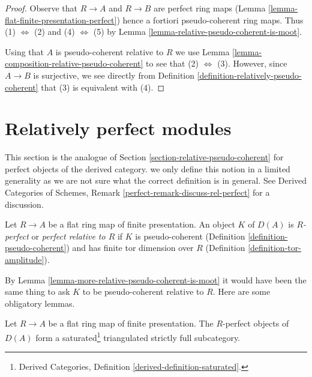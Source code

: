 \begin{proof}
Observe that $R \to A$ and $R \to B$ are perfect ring maps
(Lemma \ref{lemma-flat-finite-presentation-perfect})
hence a fortiori pseudo-coherent ring maps.
Thus (1) $\Leftrightarrow$ (2) and (4) $\Leftrightarrow$ (5)
by Lemma \ref{lemma-relative-pseudo-coherent-is-moot}.

\medskip\noindent
Using that $A$ is pseudo-coherent relative to $R$ we use
Lemma \ref{lemma-composition-relative-pseudo-coherent}
to see that (2) $\Leftrightarrow$ (3).
However, since $A \to B$ is surjective, we see directly from
Definition \ref{definition-relatively-pseudo-coherent}
that (3) is equivalent with (4).
\end{proof}



\section{Relatively perfect modules}
\label{section-relatively-perfect}

\noindent
This section is the analogue of
Section \ref{section-relative-pseudo-coherent}
for perfect objects of the derived category.
we only define this notion in a limited
generality as we are not sure what the correct
definition is in general. See
Derived Categories of Schemes, Remark
\ref{perfect-remark-discuss-rel-perfect}
for a discussion.

\begin{definition}
\label{definition-relatively-perfect}
Let $R \to A$ be a flat ring map of finite presentation.
An object $K$ of $D(A)$ is {\it $R$-perfect} or {\it perfect relative to $R$}
if $K$ is pseudo-coherent
(Definition \ref{definition-pseudo-coherent})
and has finite tor dimension over $R$
(Definition \ref{definition-tor-amplitude}).
\end{definition}

\noindent
By Lemma \ref{lemma-more-relative-pseudo-coherent-is-moot}
it would have been the same thing to ask $K$ to be
pseudo-coherent relative to $R$.
Here are some obligatory lemmas.

\begin{lemma}
\label{lemma-cone-relatively-perfect}
Let $R \to A$ be a flat ring map of finite presentation.
The $R$-perfect objects of $D(A)$ form a
saturated\footnote{Derived Categories, Definition
\ref{derived-definition-saturated}.} triangulated
strictly full subcategory.
\end{lemma}

